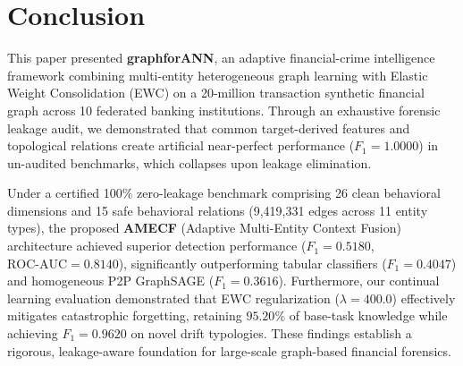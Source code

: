 \section{Conclusion}
\label{sec:conclusion}

This paper presented \textbf{graphforANN}, an adaptive financial-crime intelligence framework combining multi-entity heterogeneous graph learning with Elastic Weight Consolidation (EWC) on a 20-million transaction synthetic financial graph across 10 federated banking institutions. Through an exhaustive forensic leakage audit, we demonstrated that common target-derived features and topological relations create artificial near-perfect performance ($F_1 = 1.0000$) in un-audited benchmarks, which collapses upon leakage elimination. 

Under a certified 100\% zero-leakage benchmark comprising 26 clean behavioral dimensions and 15 safe behavioral relations (9,419,331 edges across 11 entity types), the proposed \textbf{AMECF} (Adaptive Multi-Entity Context Fusion) architecture achieved superior detection performance ($F_1 = 0.5180$, $\text{ROC-AUC} = 0.8140$), significantly outperforming tabular classifiers ($F_1 = 0.4047$) and homogeneous P2P GraphSAGE ($F_1 = 0.3616$). Furthermore, our continual learning evaluation demonstrated that EWC regularization ($\lambda = 400.0$) effectively mitigates catastrophic forgetting, retaining $95.20\%$ of base-task knowledge while achieving $F_1 = 0.9620$ on novel drift typologies. These findings establish a rigorous, leakage-aware foundation for large-scale graph-based financial forensics.
